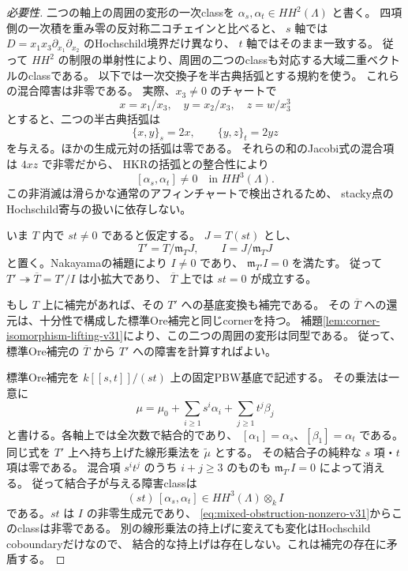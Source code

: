 \begin{proof}[必要性]
二つの軸上の周囲の変形の一次classを
$\alpha_s,\alpha_t\in HH^2(\Lambda)$ と書く。
四項側の一次積を重み零の反対称二コチェインと比べると、
$s$ 軸では $D=x_1x_3\partial_{x_1}\partial_{x_2}$ のHochschild境界だけ異なり、
$t$ 軸ではそのまま一致する。
従って $HH^2$ の制限の単射性により、周囲の二つのclassも対応する大域二重ベクトルのclassである。
以下では一次交換子を半古典括弧とする規約を使う。
これらの混合障害は非零である。
実際、$x_3\ne0$ のチャートで
\[
 x=x_1/x_3,\quad y=x_2/x_3,\quad z=w/x_3^3
\]
とすると、二つの半古典括弧は
\[
 \{x,y\}_s=2x,\qquad \{y,z\}_t=2yz
\]
を与える。ほかの生成元対の括弧は零である。
それらの和のJacobi式の混合項は $4xz$ で非零だから、
HKRの括弧との整合性により
\begin{equation}\label{eq:mixed-obstruction-nonzero-v31}
 [\alpha_s,\alpha_t]\ne0\quad\text{in }HH^3(\Lambda).
\end{equation}
この非消滅は滑らかな通常のアフィンチャートで検出されるため、
stacky点のHochschild寄与の扱いに依存しない。

いま $T$ 内で $st\ne0$ であると仮定する。
$J=T(st)$ とし、
\[
 T'=T/\mathfrak m_TJ,\qquad I=J/\mathfrak m_TJ
\]
と置く。Nakayamaの補題により $I\ne0$ であり、
$\mathfrak m_{T'}I=0$ を満たす。
従って $T'\twoheadrightarrow\overline T=T'/I$ は小拡大であり、
$\overline T$ 上では $st=0$ が成立する。

もし $T$ 上に補完があれば、その $T'$ への基底変換も補完である。
その $\overline T$ への還元は、十分性で構成した標準Ore補完と同じcornerを持つ。
補題\ref{lem:corner-isomorphism-lifting-v31}により、この二つの周囲の変形は同型である。
従って、標準Ore補完の $\overline T$ から $T'$ への障害を計算すればよい。

標準Ore補完を $k[[s,t]]/(st)$ 上の固定PBW基底で記述する。
その乗法は一意に
\[
 \mu=\mu_0+\sum_{i\ge1}s^i\alpha_i+\sum_{j\ge1}t^j\beta_j
\]
と書ける。各軸上では全次数で結合的であり、
$[\alpha_1]=\alpha_s$、$[\beta_1]=\alpha_t$ である。
同じ式を $T'$ 上へ持ち上げた線形乗法を $\widetilde\mu$ とする。
その結合子の純粋な $s$ 項・$t$ 項は零である。
混合項 $s^it^j$ のうち $i+j\ge3$ のものも
$\mathfrak m_{T'}I=0$ によって消える。
従って結合子が与える障害classは
\[
 (st)\,[\alpha_s,\alpha_t]\in HH^3(\Lambda)\otimes_k I
\]
である。$st$ は $I$ の非零生成元であり、
\eqref{eq:mixed-obstruction-nonzero-v31}からこのclassは非零である。
別の線形乗法の持上げに変えても変化はHochschild coboundaryだけなので、
結合的な持上げは存在しない。これは補完の存在に矛盾する。
\end{proof}

